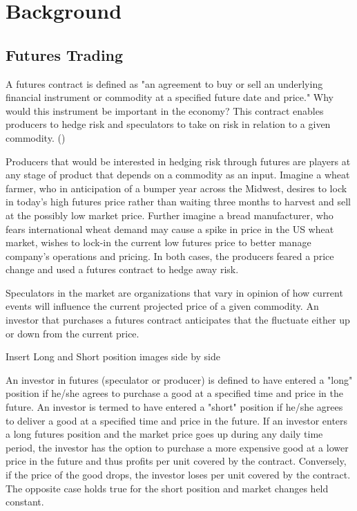 \documentclass[twoside,11pt]{article}
\begin{document}
\section{Background} \label{background}

\subsection{Futures Trading}
	A futures contract is defined as "an agreement to buy or sell an underlying financial instrument or commodity at a specified future date and price." Why would this instrument be important in the economy? This contract enables producers to hedge risk and speculators to take on risk in relation to a given commodity. (\cite{InvestopediaF})
	
  Producers that would be interested in hedging risk through futures are players at any stage of product that depends on a commodity as an input. Imagine a wheat farmer, who in anticipation of a bumper year across the Midwest, desires to lock in today's high futures price rather than waiting three months to harvest and sell at the possibly low market price. Further imagine a bread manufacturer, who fears international wheat demand may cause a spike in price in the US wheat market, wishes to lock-in the current low futures price to better manage company's operations and pricing. In both cases, the producers feared a price change and used a futures contract to hedge away risk.
  
  Speculators in the market are organizations that vary in opinion of how current events will influence the current projected price of a given commodity. An investor that purchases a futures contract anticipates that the fluctuate either up or down from the current price.

  Insert Long and Short position images side by side

  An investor in futures (speculator or producer) is defined to have entered a "long" position if he/she agrees to purchase a good at a specified time and price in the future. An investor is termed to have entered a "short" position if he/she agrees to deliver a good at a specified time and price in the future. If an investor enters a long futures position and the market price goes up  during any daily time period, the investor has the option to purchase a more expensive good at a lower price in the future and thus profits  per unit covered by the contract. Conversely, if the price of the good drops, the investor loses  per unit covered by the contract. The opposite case holds true for the short position and market changes held constant.
  
\end{document}
